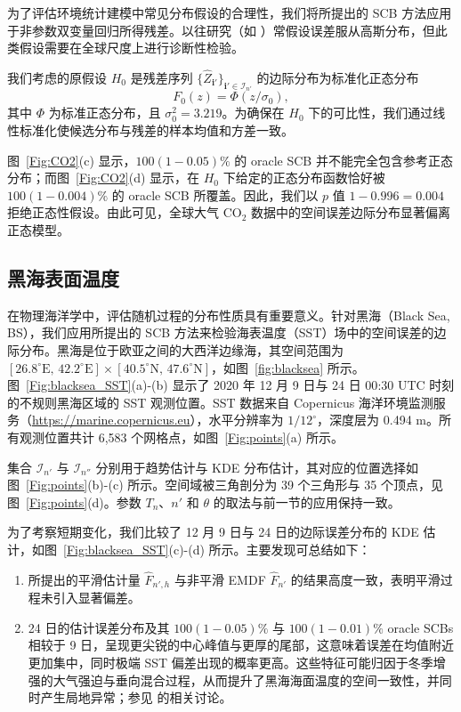 \documentclass[a4paper,openay,14pt]{ctexbook}
\numberwithin{equation}{section}
\numberwithin{lem}{section}
\begin{document}
为了评估环境统计建模中常见分布假设的合理性，我们将所提出的 SCB 方法应用于非参数双变量回归所得残差。以往研究（如 \cite{pearman1986global}）常假设误差服从高斯分布，但此类假设需要在全球尺度上进行诊断性检验。

我们考虑的原假设 $H_0$ 是残差序列 \( \{ \hat{Z}_{\mathbf{i}'} \}_{\mathbf{i}' \in \mathcal{I}_{n'}} \) 的边际分布为标准化正态分布
\[
F_0(z) = \Phi(z /\sigma_0),
\]
其中 \( \Phi \) 为标准正态分布，且 \( \sigma_0^2 = 3.219 \)。为确保在 $H_0$ 下的可比性，我们通过线性标准化使候选分布与残差的样本均值和方差一致。

图~\ref{Fig:CO2}(c) 显示，$100(1-0.05)\%$ 的 oracle SCB 并不能完全包含参考正态分布；而图~\ref{Fig:CO2}(d) 显示，在 $H_0$ 下给定的正态分布函数恰好被 $100(1-0.004)\%$ 的 oracle SCB 所覆盖。因此，我们以 $p$ 值 $1-0.996 = 0.004$ 拒绝正态性假设。由此可见，全球大气 CO$_2$ 数据中的空间误差边际分布显著偏离正态模型。


\subsection{黑海表面温度}

在物理海洋学中，评估随机过程的分布性质具有重要意义。针对黑海（Black Sea, BS），我们应用所提出的 SCB 方法来检验海表温度（SST）场中的空间误差的边际分布。黑海是位于欧亚之间的大西洋边缘海，其空间范围为 \([26.8^{\circ}\text{E},\,42.2^{\circ}\text{E}] \times [40.5^{\circ}\text{N},\,47.6^{\circ}\text{N}]\)，如图~\ref{fig:blacksea} 所示。图~\ref{Fig:blacksea_SST}(a)-(b) 显示了 2020 年 12 月 9 日与 24 日 00{:}30 UTC 时刻的不规则黑海区域的 SST 观测位置。SST 数据来自 Copernicus 海洋环境监测服务（\url{https://marine.copernicus.eu}），水平分辨率为 \(1/12^{\circ}\)，深度层为 0.494 m。所有观测位置共计 6,583 个网格点，如图~\ref{Fig:points}(a) 所示。

集合 \(\mathcal{I}_{n'}\) 与 \(\mathcal{I}_{n''}\) 分别用于趋势估计与 KDE 分布估计，其对应的位置选择如图~\ref{Fig:points}(b)-(c) 所示。空间域被三角剖分为 39 个三角形与 35 个顶点，见图~\ref{Fig:points}(d)。参数 \(T_n\)、\(n'\) 和 \(\theta\) 的取法与前一节的应用保持一致。

为了考察短期变化，我们比较了 12 月 9 日与 24 日的边际误差分布的 KDE 估计，如图~\ref{Fig:blacksea_SST}(c)-(d) 所示。主要发现可总结如下：
\begin{enumerate}[(1)]
    \item 所提出的平滑估计量 \(\hat{F}_{n',h}\) 与非平滑 EMDF \(\hat{F}_{n'}\) 的结果高度一致，表明平滑过程未引入显著偏差。
    \item 24 日的估计误差分布及其 $100(1-0.05)\%$ 与 $100(1-0.01)\%$ oracle SCBs 相较于 9 日，呈现更尖锐的中心峰值与更厚的尾部，这意味着误差在均值附近更加集中，同时极端 SST 偏差出现的概率更高。这些特征可能归因于冬季增强的大气强迫与垂向混合过程，从而提升了黑海海面温度的空间一致性，并同时产生局地异常；参见 \cite{baltaci2024spatiotemporal} 的相关讨论。
\end{enumerate}
\end{document}
